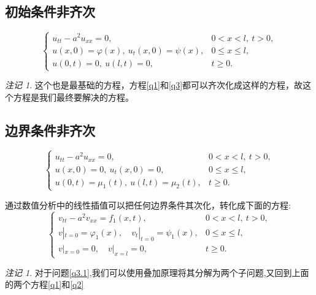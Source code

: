\documentclass[12pt,a4paper]{article}
\numberwithin{subsection}{section}
\numberwithin{subsubsection}{subsection}
\theoremstyle{plain}
\theoremstyle{definition}
\theoremstyle{remark}
\newtheorem{remark}[theorem]{注记}
\begin{document}
	\subsection{初始条件非齐次}
		\begin{equation}\label{q2}
			\begin{cases}
				u_{tt} - a^2 u_{xx} = 0, & 0 < x < l, \ t > 0, \\
				u(x, 0) = \varphi(x), \ u_t(x, 0) = \psi(x), & 0 \leq x \leq l, \\
				u(0, t) = 0, \ u(l, t) = 0, & t \geq 0.
			\end{cases}
		\end{equation}
\begin{remark}
	这个也是最基础的方程，方程\eqref{q1}和\eqref{q3}都可以齐次化成这样的方程，故这个方程是我们最终要解决的方程。
\end{remark}
	
	
	\subsection{边界条件非齐次}
	\begin{equation}\label{q3}
		\begin{cases}
			u_{tt} - a^2 u_{xx} = 0, & 0 < x < l, \ t > 0, \\
			u(x, 0) = 0, \ u_t(x, 0) = 0, & 0 \leq x \leq l, \\
			u(0, t) = \mu_1(t), \ u(l, t) = \mu_2(t), & t \geq 0.
		\end{cases}
	\end{equation}	
	
	通过数值分析中的线性插值可以把任何边界条件其次化，转化成下面的方程:
	\begin{equation}\label{q3.1}
	\begin{cases}
		v_{tt} - a^2 v_{xx} = f_1(x, t), & 0 < x < l, \ t > 0, \\
		v|_{t=0} = \varphi_1(x), \quad v_t|_{t=0} = \psi_1(x), & 0 \leq x \leq l, \\
		v|_{x=0} = 0, \quad v|_{x=l} = 0, & t \geq 0.
	\end{cases}
\end{equation}
	
	
	\begin{remark}
	对于问题\eqref{q3.1},我们可以使用叠加原理将其分解为两个子问题,又回到上面的两个方程\eqref{q1}和\eqref{q2}
\end{remark}

	

	
	\newpage
	
\end{document}
